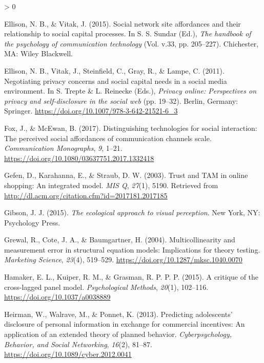 \documentclass[
  english,
  man,floatsintext]{apa6}
\newlength{\cslhangindent}
\newenvironment{CSLReferences}[2] %
 {%
  \setlength{\parindent}{0pt}
  \ifodd #1 \everypar{\setlength{\hangindent}{\cslhangindent}}\ignorespaces\fi
  \ifnum #2 > 0
  \setlength{\parskip}{#2\baselineskip}
  \fi
 }%
 {}
\begin{document}
\begin{CSLReferences}{1}{0}
\leavevmode\hypertarget{ref-ellisonSocialNetworkSite2015}{}%
Ellison, N. B., \& Vitak, J. (2015). Social network site affordances and their relationship to social capital processes. In S. S. Sundar (Ed.), \emph{The handbook of the psychology of communication technology} (Vol. v.33, pp. 205--227). Chichester, MA: Wiley Blackwell.

\leavevmode\hypertarget{ref-ellisonNegotiatingPrivacyConcerns2011}{}%
Ellison, N. B., Vitak, J., Steinfield, C., Gray, R., \& Lampe, C. (2011). Negotiating privacy concerns and social capital needs in a social media environment. In S. Trepte \& L. Reinecke (Eds.), \emph{Privacy online: {Perspectives} on privacy and self-disclosure in the social web} (pp. 19--32). Berlin, Germany: Springer. \url{https://doi.org/10.1007/978-3-642-21521-6_3}

\leavevmode\hypertarget{ref-foxDistinguishingTechnologiesSocial2017}{}%
Fox, J., \& McEwan, B. (2017). Distinguishing technologies for social interaction: {The} perceived social affordances of communication channels scale. \emph{Communication Monographs}, \emph{9}, 1--21. \url{https://doi.org/10.1080/03637751.2017.1332418}

\leavevmode\hypertarget{ref-gefenTrustTAMOnline2003}{}%
Gefen, D., Karahanna, E., \& Straub, D. W. (2003). Trust and {TAM} in online shopping: {An} integrated model. \emph{MIS Q}, \emph{27}(1), 5190. Retrieved from \url{http://dl.acm.org/citation.cfm?id=2017181.2017185}

\leavevmode\hypertarget{ref-gibsonEcologicalApproachVisual2015}{}%
Gibson, J. J. (2015). \emph{The ecological approach to visual perception}. New York, NY: Psychology Press.

\leavevmode\hypertarget{ref-grewalMulticollinearityMeasurementError2004}{}%
Grewal, R., Cote, J. A., \& Baumgartner, H. (2004). Multicollinearity and measurement error in structural equation models: {Implications} for theory testing. \emph{Marketing Science}, \emph{23}(4), 519--529. \url{https://doi.org/10.1287/mksc.1040.0070}

\leavevmode\hypertarget{ref-hamakerCritiqueCrosslaggedPanel2015}{}%
Hamaker, E. L., Kuiper, R. M., \& Grasman, R. P. P. P. (2015). A critique of the cross-lagged panel model. \emph{Psychological Methods}, \emph{20}(1), 102--116. \url{https://doi.org/10.1037/a0038889}

\leavevmode\hypertarget{ref-heirmanPredictingAdolescentsDisclosure2013}{}%
Heirman, W., Walrave, M., \& Ponnet, K. (2013). Predicting adolescents' disclosure of personal information in exchange for commercial incentives: {An} application of an extended theory of planned behavior. \emph{Cyberpsychology, Behavior, and Social Networking}, \emph{16}(2), 81--87. \url{https://doi.org/10.1089/cyber.2012.0041}


\end{CSLReferences}
\end{document}
